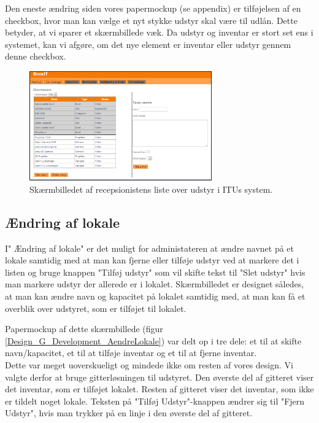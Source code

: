 Den eneste ændring siden vores papermockup (se appendix) er tilføjelsen af en checkbox, hvor man kan vælge et nyt stykke udstyr skal være til udlån. Dette betyder, at vi sparer et skærmbillede væk. Da udstyr og inventar er stort set ens i systemet, kan vi afgøre, om det nye element er inventar eller udstyr gennem denne checkbox.

\begin{figure}[h!]
  \centering
    \includegraphics[width=0.7\textwidth]{Appendix/GUI-Prototype/DigitalMockup/UdstyrsListe}
  \caption{Skærmbilledet af recepsionistens liste over udstyr i ITUs system.}
\label{Design_G_Development_UdstyrsListe_Final}
\end{figure} 

\subsection{Ændring af lokale}
I" Ændring af lokale" er det muligt for administateren at ændre navnet på et lokale samtidig med at man kan fjerne eller tilføje udstyr ved at markere det i listen og bruge knappen "Tilføj udstyr" som vil skifte tekst til "Slet udstyr" hvis man markere udstyr der allerede er i lokalet.
Skærmbilledet er designet således, at man kan ændre navn og kapacitet på lokalet samtidig med, at man kan få et overblik over udstyret, som er tilføjet til lokalet.

Papermockup af dette skærmbillede (figur \ref{Design_G_Development_AendreLokale}) var delt op i tre dele: et til at skifte navn/kapacitet, et til at tilføje inventar og et til at fjerne inventar.
\\Dette var meget uoverskueligt og mindede ikke om resten af vores design. Vi valgte derfor at bruge gitterløsningen til udstyret. Den øverste del af gitteret viser det inventar, som er tilføjet lokalet. Resten af gitteret viser det inventar, som ikke er tildelt noget lokale. Teksten på "Tilføj Udstyr"-knappen ændrer sig til "Fjern Udstyr", hvis man trykker på en linje i den øverste del af gitteret.

